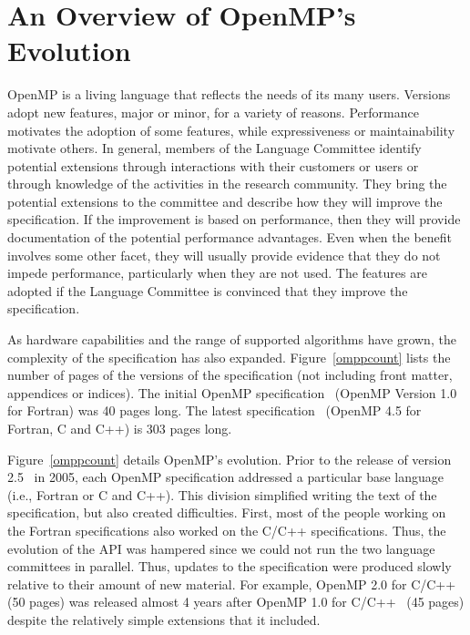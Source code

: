 \section{An Overview of OpenMP's Evolution}
\label{sec:evolve}

OpenMP is a living language that reflects the needs of its many users.  Versions
adopt new features, major or minor, for a variety of reasons. Performance
motivates the adoption of some features, while expressiveness or maintainability
motivate others. In general, members of the Language Committee identify
potential extensions through interactions with their customers or users or
through knowledge of the activities in the research community. They bring the
potential extensions to the committee and describe how they will improve the
specification. If the improvement is based on performance, then they will
provide documentation of the potential performance advantages.  Even when the
benefit involves some other facet, they will usually provide evidence that they
do not impede performance, particularly when they are not used. The features are
adopted if the Language Committee is convinced that they improve the
specification.

As hardware capabilities and the range of supported algorithms have 
grown, the complexity of the specification has also expanded. 
Figure~\ref{omppcount} lists the number of pages of the versions of 
the specification (not including front matter, appendices or indices).   
The initial OpenMP specification~\cite{openmp1f} (OpenMP Version 1.0 for
Fortran) was 40 pages long. The latest specification~\cite{openmp45} (OpenMP 4.5
for Fortran, C and C++) is 303 pages long.

Figure~\ref{omppcount} details OpenMP's evolution. Prior to the release 
of version 2.5~\cite{openmp25} in 2005, each OpenMP specification addressed 
a particular base language (i.e., Fortran or C and C++). This division 
simplified writing the text of the specification, but also created 
difficulties. First, most of the people working on the Fortran specifications 
also worked on the C/C++ specifications. Thus, the evolution of the API was 
hampered since we could not run the two language committees in parallel. Thus,
updates to the specification were produced slowly relative to their amount of 
new material. For example, OpenMP 2.0 for C/C++~\cite{openmp2c} (50 pages) 
was released almost 4 years after OpenMP 1.0 for C/C++~\cite{openmp1c} (45 
pages) despite the relatively simple extensions that it included. 

